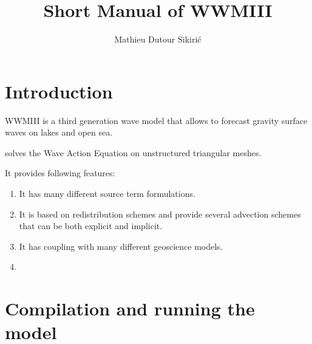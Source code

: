 \documentclass[12pt]{amsart}
\begin{document}
\author{Mathieu Dutour Sikiri\'c}
\address{Mathieu Dutour Sikiri\'c, Rudjer Boskovi\'c Institute, Bijenicka 54, 10000 Zagreb, Croatia}


\title{Short Manual of WWMIII}
\date{}

\maketitle


\section{Introduction}
WWMIII is a third generation wave model that allows to forecast gravity surface waves
on lakes and open sea.

solves the Wave Action Equation on unstructured triangular meshes.





It provides following features:
\begin{enumerate}
\item It has many different source term formulations.
\item It is based on redistribution schemes and provide several advection
  schemes that can be both explicit and implicit.
\item It has coupling with many different geoscience models.
\item 
\end{enumerate}



\section{Compilation and running the model}
\end{document}
